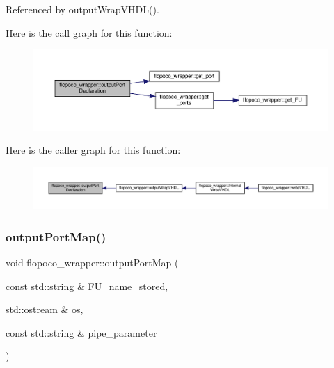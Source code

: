 Referenced by output\+Wrap\+V\+H\+D\+L().

Here is the call graph for this function\+:
\nopagebreak
\begin{figure}[H]
\begin{center}
\leavevmode
\includegraphics[width=350pt]{d7/dbf/classflopoco__wrapper_a121477e55d07d3d493c879d80ddb5770_cgraph}
\end{center}
\end{figure}
Here is the caller graph for this function\+:
\nopagebreak
\begin{figure}[H]
\begin{center}
\leavevmode
\includegraphics[width=350pt]{d7/dbf/classflopoco__wrapper_a121477e55d07d3d493c879d80ddb5770_icgraph}
\end{center}
\end{figure}
\mbox{\label{classflopoco__wrapper_aeaeed1e93ec604948ffff0085503cd3b}} 
\subsubsection{\texorpdfstring{output\+Port\+Map()}{outputPortMap()}}
{\footnotesize\ttfamily void flopoco\+\_\+wrapper\+::output\+Port\+Map (\begin{DoxyParamCaption}\item[{const std\+::string \&}]{F\+U\+\_\+name\+\_\+stored,  }\item[{std\+::ostream \&}]{os,  }\item[{const std\+::string \&}]{pipe\+\_\+parameter }\end{DoxyParamCaption})\hspace{0.3cm}{\ttfamily [private]}}



